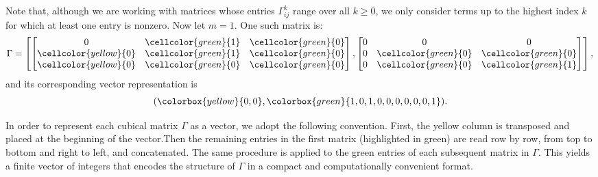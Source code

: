 \documentclass[11pt]{article}
\begin{document}
 Note that, although we are working with matrices whose entries $\Gamma_{ij}^{k}$ range over all $k\geq 0$, we only consider terms up to the highest index $k$ for which at least one entry is nonzero. 
Now let $m = 1$. One such matrix is:
    $$\Gamma = \left[
        \begin{bmatrix}
            0 & \cellcolor{green}{1} & \cellcolor{green}{0}\\
            \cellcolor{yellow}{0} & \cellcolor{green}{1} & \cellcolor{green}{0}\\
            \cellcolor{yellow}{0} & \cellcolor{green}{0} & \cellcolor{green}{0}
        \end{bmatrix},
        \begin{bmatrix}
           0 & 0 & 0\\
           0 & \cellcolor{green}{0} & \cellcolor{green}{0}\\
           0 & \cellcolor{green}{0} & \cellcolor{green}{1} 
        \end{bmatrix}\right],
    $$ 
 and its corresponding vector representation is
    $$(\colorbox{yellow}{0, 0},\colorbox{green}{1, 0, 1, 0, 0, 0, 0, 0, 0, 1}).$$
    
    
 In order to represent each cubical matrix $\Gamma$ as a vector, we adopt the following convention. First, the yellow column is transposed and placed at the beginning of the vector.Then the remaining entries in the first matrix (highlighted in green) are read row by row, from top to bottom and right to left, and concatenated. The same procedure is applied to the green entries of each subsequent matrix in $\Gamma$. This yields a finite vector of integers that encodes the structure of $\Gamma$ in a compact and computationally convenient format.
 
\end{document}
